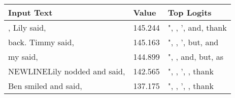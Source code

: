 \documentclass{article}
\begin{document}
\begin{longtable}{p{} p{} p{}}
\toprule
\textbf{Input Text} & \textbf{Value} & \textbf{Top Logits} \\
\midrule
, Lily said, & 145.244 & ", , ', and, thank \\
back. Timmy said, & 145.163 & ", , ', but, and \\
my said, & 144.899 & ", , and, but, as \\
NEWLINELily nodded and said, & 142.565 & ", , ', , thank \\
Ben smiled and said, & 137.175 & ", , ', , thank \\

\bottomrule
\end{longtable}
\end{document}
